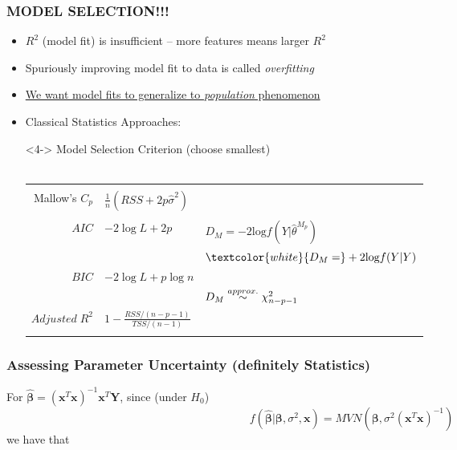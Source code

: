 \documentclass[xcolor={dvipsnames}]{beamer}
\begin{document}
\frame
{
 \frametitle{MODEL SELECTION!!!}

\begin{itemize}
\item<1-> $R^2$ (model fit) is insufficient -- more features means larger $R^2$
\item<2-> Spuriously improving model fit to data is called \emph{overfitting}
\item<3-> \underline{We want model fits to generalize to \emph{population} phenomenon} 
\item[]
\item<4-> Classical Statistics Approaches: 
\item[]<4-> Model Selection Criterion (choose smallest)\\${}$\\
\begin{tabular}{|rl|l|}
\hline & &\\
Mallow's $C_p$ & $\frac{1}{n}(RSS + 2p\hat\sigma^2)$ & \\
&&\\
$AIC$ & $-2\log L+2p$          & $D_M = - 2\text{log}f(Y|\hat \theta^{M_p})$ \\
&                                            &  $ \textcolor{white}{D_M = } + 2\text{log}f(Y|Y)$ \\             
$BIC$ & $-2\log L+p\log n $  & \\
&&\textcolor{gray}{$D_M \overset{\tiny approx.}{\sim}   \chi^2_{n-p-1}$} \\
$Adjusted \; R^2$ & $1 - \frac{RSS/(n-p-1)}{TSS/(n-1)}$& \\
&&\\\hline 
\end{tabular}
\end{itemize}

}



\frame
{
\frametitle{Assessing Parameter Uncertainty \textbf{(definitely Statistics)}}
 
For $\hat{\boldsymbol\beta}  = (\textbf{x}^T\textbf{x})^{-1}  \textbf{x}^T\textbf{Y}$, since (under $H_0$)
$$f(\hat {\boldsymbol\beta} | {\boldsymbol\beta}, \sigma^2, \textbf{x}) = MVN\left({\boldsymbol\beta}, \sigma^2(\textbf{x}^T \textbf{x})^{-1}\right)$$
we have that 
\vspace{-.25em}

}
\end{document}
